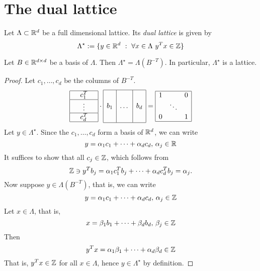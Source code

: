 \section{The dual lattice}

\begin{definition}
  Let $\Lambda \subset \mathbb{R}^d$ be a full dimensional lattice.
  Its \emph{dual lattice} is given by
  \[
    \Lambda^\star := \{ y \in \mathbb{R}^d ~:~ \forall x \in \Lambda \ y^Tx \in \mathbb{Z} \}
  \]
\end{definition}

\begin{lemma}
  \label{lemma:dual-basis}
  Let $B \in \mathbb{R}^{d \times d}$ be a basis of $\Lambda$.
  Then $\Lambda^\star = \Lambda(B^{-T})$.
  In particular, $\Lambda^\star$ is a lattice.
\end{lemma}
\begin{proof}
  Let $c_1, \ldots, c_d$ be the columns of $B^{-T}$.
  \[
    \begin{array}{|c|}
      \hline \quad c_1^T \quad  \\\hline
      \vdots \\\hline
      c_d^T \\\hline
    \end{array}
    \cdot
    \begin{array}{|c|c|c|}
      \hline  & &\\[0.5em]
      b_1 & \dots & b_d \\
      & & \\[0.5em]\hline
    \end{array}
    =
    \begin{array}{|lcr|}
      \hline 1 & & 0 \\
       & \ddots & \\
      0 & & 1 \\\hline
    \end{array}
  \]
  Let $y \in \Lambda^\star$.
  Since the $c_1, \ldots, c_d$ form a basis of $\mathbb{R}^d$,
  we can write
  \[
    y = \alpha_1 c_1 + \dots + \alpha_d c_d,\, \alpha_j \in \mathbb{R}
  \]
  It suffices to show that all $c_j \in \mathbb{Z}$,
  which follows from
  \[
    \mathbb{Z} \ni y^T b_j = \alpha_1 c_1^T b_j + \dots + \alpha_d c_d^T b_j = \alpha_j.
  \]
  Now suppose $y \in \Lambda(B^{-T})$, that is,
  we can write
  \[
    y = \alpha_1 c_1 + \dots + \alpha_d c_d,\, \alpha_j \in \mathbb{Z}
  \]
  Let $x \in \Lambda$, that is,
  \[
    x = \beta_1 b_1 + \dots + \beta_d b_d,\, \beta_j \in \mathbb{Z}
  \]
  Then
  \[
    y^Tx = \alpha_1 \beta_1 + \dots + \alpha_d \beta_d \in \mathbb{Z}
  \]
  That is, $y^Tx \in \mathbb{Z}$ for all $x \in \Lambda$,
  hence $y \in \Lambda^\star$ by definition.
\end{proof}

